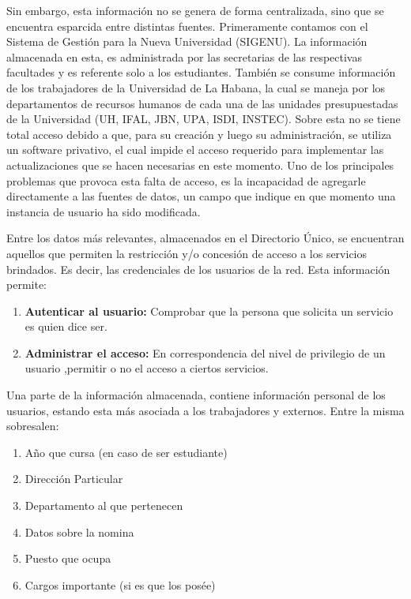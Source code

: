 Sin embargo, esta información no se genera de forma centralizada, sino que se encuentra 
esparcida entre distintas fuentes. Primeramente contamos con el Sistema de Gestión para la 
Nueva Universidad (SIGENU). La información almacenada en esta, es administrada por las 
secretarias de las respectivas facultades y es referente solo a los estudiantes. También se
consume información de los trabajadores de la Universidad de La Habana, la cual se maneja 
por los departamentos de recursos humanos de cada una de las unidades presupuestadas de la 
Universidad (UH, IFAL, JBN, UPA, ISDI, INSTEC). Sobre esta no se tiene total 
acceso debido a que, para su creación y luego su administración, se utiliza un software 
privativo, el cual impide el acceso requerido para implementar las actualizaciones que se 
hacen necesarias en este momento.  
Uno de los principales problemas que provoca esta falta de acceso, es la 
incapacidad de agregarle directamente a las fuentes de datos, un campo que indique en que 
momento una instancia de usuario ha sido modificada. 

Entre los datos más relevantes, almacenados en el Directorio Único, se encuentran aquellos 
que permiten la restricción y/o concesión de acceso a los servicios brindados. Es decir, 
las credenciales de los usuarios de la red. Esta información permite:

\begin{enumerate}
\item {\bf Autenticar al usuario:} Comprobar que la persona que solicita un servicio es 
quien dice ser.
\item {\bf Administrar el acceso:} En correspondencia del nivel de privilegio de un usuario 
,permitir o no el acceso a ciertos servicios.
\end{enumerate}

Una parte de la información almacenada, contiene información personal de los usuarios,
estando esta más asociada a los trabajadores y externos. Entre la 
misma sobresalen: 
\begin{enumerate}
	\item Año que cursa (en caso de ser estudiante)
	\item Direcci\'on Particular
	\item Departamento al que pertenecen
	\item Datos sobre la nomina
	\item Puesto que ocupa
	\item Cargos importante (si es que los pos\'ee)
\end{enumerate}

